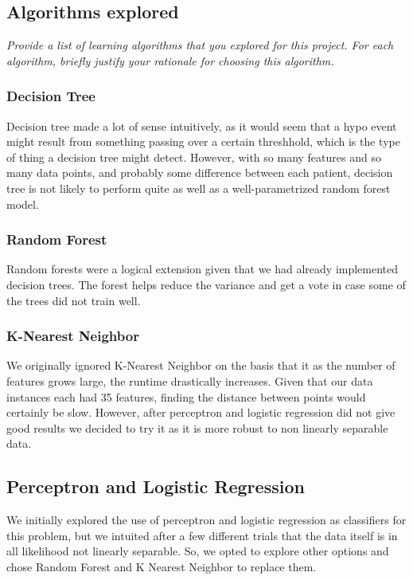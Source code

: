 \documentclass[11pt,a4paper]{article}
\begin{document}
\subsection{Algorithms explored}
\textit{Provide a list of learning algorithms that you explored for this project. For each algorithm, briefly justify your rationale for choosing this algorithm.}

\subsubsection{Decision Tree}
Decision tree made a lot of sense intuitively, as it would seem that a hypo event might result from something passing over a certain threshhold, which is the type of thing a decision tree might detect. However, with so many features and so many data points, and probably some difference between each patient, decision tree is not likely to perform quite as well as a well-parametrized random forest model.

\subsubsection{Random Forest}
Random forests were a logical extension given that we had already implemented decision trees. The forest helps reduce the variance and get a vote in case some of the trees did not train well.

\subsubsection{K-Nearest Neighbor}
We originally ignored K-Nearest Neighbor on the basis that it as the number of features grows large, the runtime drastically increases. Given that our data instances each had 35 features, finding the distance between points would certainly be slow. However, after perceptron and logistic regression did not give good results we decided to try it as it is more robust to non linearly separable data.

\subsection{Perceptron and Logistic Regression}
We initially explored the use of perceptron and logistic regression as classifiers for this problem, but we intuited after a few different trials that the data itself is in all likelihood not linearly separable. So, we opted to explore other options and chose Random Forest and K Nearest Neighbor to replace them.
\end{document}
